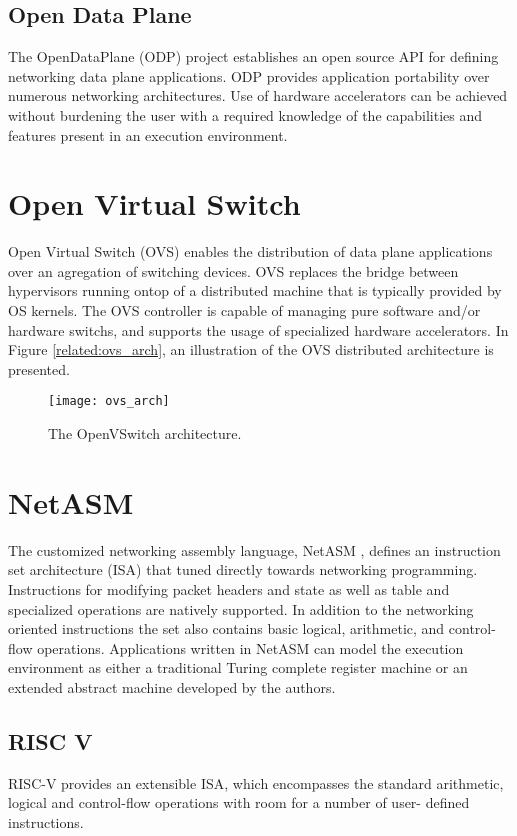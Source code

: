 \subsection{Open Data Plane}
\label{related:frameworks:odp}
The OpenDataPlane (ODP) project \cite{odp} establishes an open source API for
defining networking data plane applications. ODP provides application
portability over numerous networking architectures. Use of hardware
accelerators can be achieved without burdening the user with a required
knowledge of the capabilities and features present in an execution environment.

\section{Open Virtual Switch}
\label{related:frameworks:ovs}
Open Virtual Switch (OVS) \cite{ovs} enables the distribution of data 
plane applications over an agregation of switching devices. OVS replaces
the bridge between hypervisors running ontop of a distributed machine that
is typically provided by OS kernels. The OVS controller is capable of managing
pure software and/or hardware switchs, and supports the usage of specialized 
hardware accelerators. In Figure \ref{related:ovs_arch}, an illustration of
the OVS distributed architecture is presented.

\begin{figure}[h]
\centering
\texttt{[image: ovs\_arch]}
\caption{The OpenVSwitch architecture.}
\label{ovs_arch}
\end{figure}

\section{NetASM}
\label{related:netasm}
The customized networking assembly language, NetASM \cite{netasm}, defines an
instruction set architecture (ISA) that tuned directly towards networking
programming. Instructions for modifying packet headers and state as well
as table and specialized operations are natively supported. In addition to the
networking oriented instructions the set also contains basic logical,
arithmetic, and control-flow operations. Applications written in NetASM can 
model the execution environment as either a traditional Turing complete 
register machine or an extended abstract machine developed by the authors.

\subsection{RISC V}
RISC-V \cite{riscv} provides an extensible ISA, which encompasses the standard 
arithmetic, logical and control-flow operations with room for a number of user-
defined instructions.
